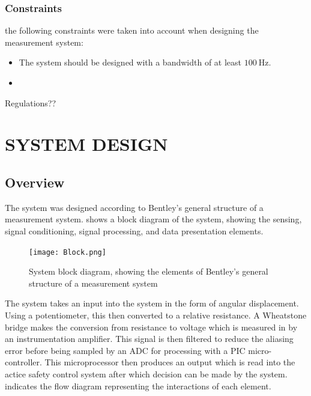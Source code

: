 \documentclass[10pt,twocolumn]{witseiepaper}
\begin{document}
\subsubsection{Constraints}

the following constraints were taken into account when designing the measurement system:
\begin{itemize}
	\item The system should be designed with a bandwidth of at least $\mathrm{100~Hz}$.
	\item 
\end{itemize}
 Regulations??

\section{SYSTEM DESIGN}

\subsection{Overview}

The system was designed according to Bentley's general structure of a measurement system.  shows a block diagram of the system, showing the sensing, signal conditioning, signal processing, and data presentation elements. 

\begin{figure}[]
	\centering
	\texttt{[image: Block.png]}
	\vspace{0.15cm}
	\caption{System block diagram, showing the elements of Bentley's general structure of a measurement system}
	\label{fig:block}
\end{figure}

The system takes an input into the system in the form of angular displacement. Using a potentiometer, this then converted to a relative resistance. A Wheatstone bridge makes the conversion from resistance to voltage which is measured in by an instrumentation amplifier. This signal is then filtered to reduce the aliasing error before being sampled by an ADC for processing with a PIC micro-controller. This microprocessor then produces an output which is read into the actice safety control system after which decision can be made by the system.  indicates the flow diagram representing the interactions of each element.
\end{document}
